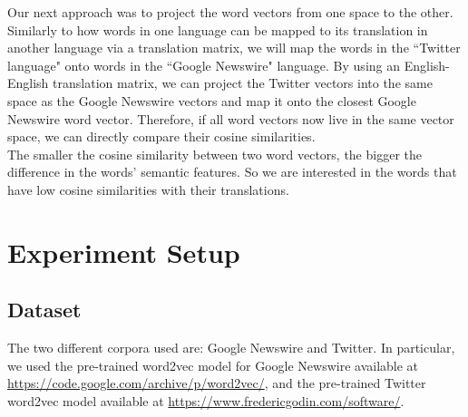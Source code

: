 \documentclass[11pt,a4paper]{article}
\begin{document}
Our next approach was to project the word vectors from one space to the other. Similarly to how words in one language can be mapped to its translation in another language via a translation matrix, we will map the words in the ``Twitter language" onto words in the ``Google Newswire" language. By using an English-English translation matrix, we can project the Twitter vectors into the same space as the Google Newswire vectors and map it onto the closest Google Newswire word vector. Therefore, if all word vectors now live in the same vector space, we can directly compare their cosine similarities.\\
The smaller the cosine similarity between two word vectors, the bigger the difference in the words' semantic features. So we are interested in the words that have low cosine similarities with their translations.

\section{Experiment Setup}

\subsection{Dataset}
The two different corpora used are: Google Newswire and Twitter. In particular, we used the pre-trained word2vec model for Google Newswire available at \url{https://code.google.com/archive/p/word2vec/}, and the pre-trained Twitter word2vec model available at \url{https://www.fredericgodin.com/software/}.
\end{document}
